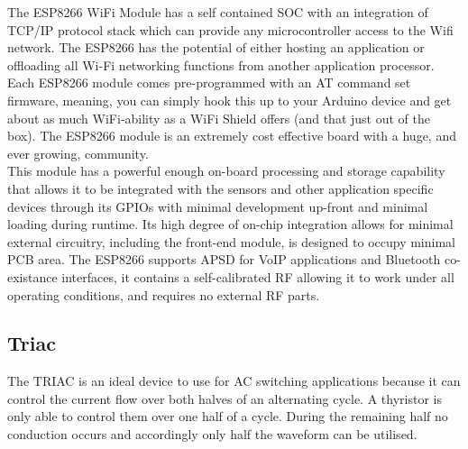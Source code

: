         The ESP8266 WiFi Module has a self contained SOC with an integration of TCP/IP protocol stack which can provide any microcontroller access to the Wifi network. The ESP8266 has the potential of either hosting an application or offloading all Wi-Fi networking functions from another application processor. Each ESP8266 module comes pre-programmed with an AT command set firmware, meaning, you can simply hook this up to your Arduino device and get about as much WiFi-ability as a WiFi Shield offers (and that just out of the box). The ESP8266 module is an extremely cost effective board with a huge, and ever growing, community.\\
        
        This module has a powerful enough on-board processing and storage capability that allows it to be integrated with the sensors and other application specific devices through its GPIOs with minimal development up-front and minimal loading during runtime. Its high degree of on-chip integration allows for minimal external circuitry, including the front-end module, is designed to occupy minimal PCB area. The ESP8266 supports APSD for VoIP applications and Bluetooth co-existance interfaces, it contains a self-calibrated RF allowing it to work under all operating conditions, and requires no external RF parts.
\subsection{Triac}
The TRIAC is an ideal device to use for AC switching applications because it can control the current flow over both halves of an alternating cycle. A thyristor is only able to control them over one half of a cycle. During the remaining half no conduction occurs and accordingly only half the waveform can be utilised.\\

